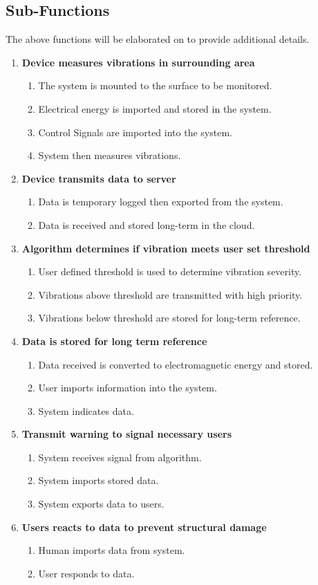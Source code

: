\documentclass[12pt]{article}
\begin{document}
\subsection{Sub-Functions}
The above functions will be elaborated on to provide additional details.
\begin{enumerate}
	\item \textbf{Device measures vibrations in surrounding area}
	\begin{enumerate}
		\item The system is mounted to the surface to be monitored.
		\item Electrical energy is imported and stored in the system.
		\item Control Signals are imported into the system.
		\item System then measures vibrations.
	\end{enumerate}
	\item \textbf{Device transmits data to server}
	\begin{enumerate}
		\item Data is temporary logged then exported from the system.
		\item Data is received and stored long-term in the cloud.
	\end{enumerate}	
	\item \textbf{ Algorithm determines if vibration meets user set threshold}
	\begin{enumerate}
		\item User defined threshold is used to determine vibration severity.
		\item Vibrations above threshold are transmitted with high priority.
		\item Vibrations below threshold are stored for long-term reference.
	\end{enumerate}	
	\item \textbf{Data is stored for long term reference}
	\begin{enumerate}
		\item Data received is converted to electromagnetic energy and stored.
		\item User imports information into the system.
		\item System indicates data.
	\end{enumerate}	
	\item \textbf{Transmit warning to signal necessary users}
	\begin{enumerate}
		\item System receives signal from algorithm.
		\item System imports stored data.
		\item System exports data to users.
	\end{enumerate}	
	\item \textbf{Users reacts to data to prevent structural damage}
	\begin{enumerate}
		\item Human imports data from system.
		\item User responds to data.
	\end{enumerate}	
\end{enumerate}
\end{document}
